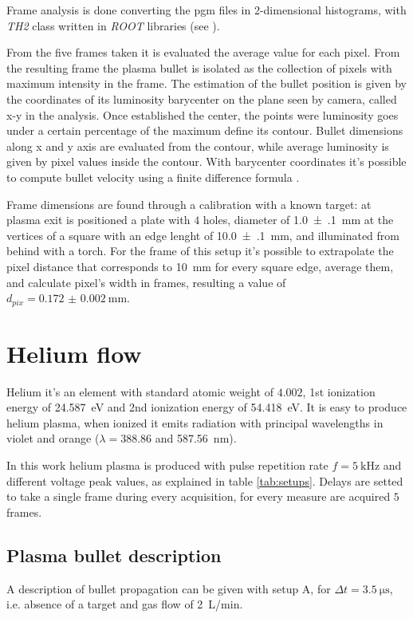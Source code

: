 Frame analysis is done converting the pgm files in 2-dimensional histograms, with \emph{TH2} class written in \emph{ROOT} libraries (see \cite{ROOT:TH2}).

From the five frames taken it is evaluated the average value for each pixel. From the resulting frame the plasma bullet is isolated as the collection of pixels with maximum intensity in the frame. The estimation of the bullet position is given by the coordinates of its luminosity barycenter on the plane seen by camera, called x-y in the analysis.
Once established the center, the points were luminosity goes under a certain percentage of the maximum define its contour. Bullet dimensions along x and y axis are evaluated from the contour, while average luminosity is given by pixel values inside the contour.
With barycenter coordinates it's possible to compute bullet velocity using a finite difference formula \cite{Bhadauria}.


Frame dimensions are found through a calibration with a known target: at plasma exit is positioned a plate with $4$ holes, diameter of \SI{1.0(1)}{\milli\meter} at the vertices of a square with an edge lenght of \SI{10.0(1)}{\milli\meter}, and illuminated from behind with a torch.
For the frame of this setup it's possible to extrapolate the pixel distance that corresponds to \SI{10}{\milli\meter} for every square edge, average them, and calculate pixel's width in frames, resulting a value of $d_{pix} = \SI{0.172(2)}{\milli\meter}$.


\section{Helium flow}
Helium it's an element with standard atomic weight of $\num{4.002}$, 1st ionization energy of \SI{24.587}{\electronvolt} and 2nd ionization energy of \SI{54.418}{\electronvolt}.
It is easy to produce helium plasma, when ionized it emits radiation with principal wavelengths in violet and orange ($\lambda = \num{388.86}$ and \SI{587.56}{\nano\meter}).

In this work helium plasma is produced with pulse repetition rate $f = \SI{5}{\kilo\hertz}$ and different voltage peak values, as explained in table \ref{tab:setups}.
Delays are setted to take a single frame during every acquisition, for every measure are acquired $5$ frames.

\subsection{Plasma bullet description}
A description of bullet propagation can be given with setup A, for $\Delta t = \SI{3.5}{\micro\second}$, i.e. absence of a target and gas flow of \SI{2}{\liter/\minute}.

